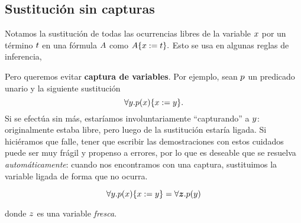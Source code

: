 \subsection{Sustitución sin capturas}\label{nd:sec:subst}

Notamos la sustitución de todas las ocurrencias libres de la variable $x$ por un término $t$ en una fórmula $A$ como
\(
    A\{x := t\}.
\)
Esto se usa en algunas reglas de inferencia,

\proofTreeForallE

Pero queremos evitar \textbf{captura de variables}. Por ejemplo, sean $p$ un predicado unario y la siguiente sustitución
\[
    \forall y . p(x)\{x := y\}.
\]
Si se efectúa sin más, estaríamos involuntariamente ``capturando'' a $y$: originalmente estaba libre, pero luego de la sustitución estaría ligada. Si hiciéramos que falle, tener que escribir las demostraciones con estos cuidados puede ser muy frágil y propenso a errores, por lo que es deseable que se resuelva \textit{automáticamente}: cuando nos encontramos con una captura, sustituimos la variable ligada de forma que no ocurra.

\[
    \forall y . p(x)\{x := y\} =
    \forall \bm{z} . p(y)
\]

donde $z$ es una variable \textit{fresca}.

